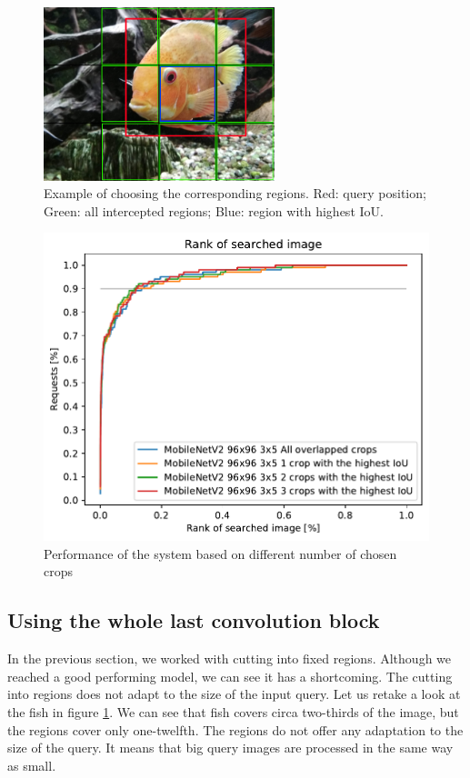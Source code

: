 \begin{figure}
\centering
\includegraphics[width=0.6\textwidth]{img/fish_grid_regions}
\caption{Example of choosing the corresponding regions. Red: query position; Green: all intercepted regions; Blue: region with highest IoU.}
\label{fig:fish_with_grid}
\end{figure}


\begin{figure}
\centering
\includegraphics[width=0.8\linewidth]{graphs/5c4a781f8e6f3eac93db2083bde3963c06582a92a8141411bf29e41251a98e75.pdf}
\caption{Performance of the system based on different number of chosen crops}
\label{fig:crop_limitation}
\end{figure}

\subsection{Using the whole last convolution block}

In the previous section, we worked with cutting into fixed regions. Although we reached a good performing model, we can see it has a shortcoming. The cutting into regions does not adapt to the size of the input query. Let us retake a look at the fish in figure \ref{fig:fish_with_grid}. We can see that fish covers circa two-thirds of the image, but the regions cover only one-twelfth. The regions do not offer any adaptation to the size of the query. It means that big query images are processed in the same way as small.

